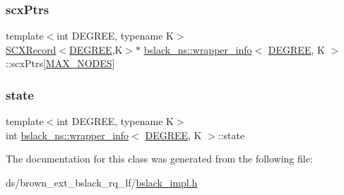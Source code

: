 \mbox{\label{classbslack__ns_1_1wrapper__info_ac26a8c05631adb0c2bc967a2ca5c2153}} 
\subsubsection{\texorpdfstring{scx\+Ptrs}{scxPtrs}}
{\footnotesize\ttfamily template$<$int D\+E\+G\+R\+EE, typename K$>$ \\
\hyperlink{structbslack__ns_1_1SCXRecord}{S\+C\+X\+Record}$<$\hyperlink{brown__sigouin__abtree__kcas_2adapter_8h_a5d88b17d70c985f2f2b8e987037fd6dd}{D\+E\+G\+R\+EE},K$>$$\ast$ \hyperlink{classbslack__ns_1_1wrapper__info}{bslack\+\_\+ns\+::wrapper\+\_\+info}$<$ \hyperlink{brown__sigouin__abtree__kcas_2adapter_8h_a5d88b17d70c985f2f2b8e987037fd6dd}{D\+E\+G\+R\+EE}, K $>$\+::scx\+Ptrs\mbox{[}\hyperlink{classbslack__ns_1_1wrapper__info_ab5bcd31a5ba96938aa04b6e43da441c4}{M\+A\+X\+\_\+\+N\+O\+D\+ES}\mbox{]}}

\mbox{\label{classbslack__ns_1_1wrapper__info_a8c1a85f3b95ec25948a888edf88b6536}} 
\subsubsection{\texorpdfstring{state}{state}}
{\footnotesize\ttfamily template$<$int D\+E\+G\+R\+EE, typename K$>$ \\
int \hyperlink{classbslack__ns_1_1wrapper__info}{bslack\+\_\+ns\+::wrapper\+\_\+info}$<$ \hyperlink{brown__sigouin__abtree__kcas_2adapter_8h_a5d88b17d70c985f2f2b8e987037fd6dd}{D\+E\+G\+R\+EE}, K $>$\+::state}



The documentation for this class was generated from the following file\+:\begin{DoxyCompactItemize}
\item 
ds/brown\+\_\+ext\+\_\+bslack\+\_\+rq\+\_\+lf/\hyperlink{bslack__impl_8h}{bslack\+\_\+impl.\+h}\end{DoxyCompactItemize}
